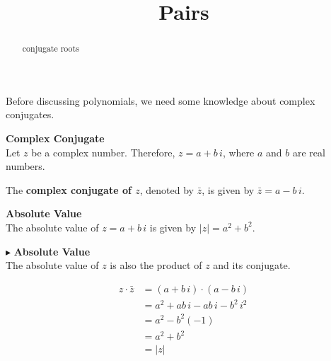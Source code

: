 \documentclass{ximera}
\title{Pairs}
\begin{document}
\begin{abstract}
conjugate roots
\end{abstract}
\maketitle







Before discussing polynomials, we need some knowledge about complex conjugates.




\begin{definition} \textbf{\textcolor{green!50!black}{Complex Conjugate}} \\

Let $z$ be a complex number.  Therefore, $z = a + b \, i$, where $a$ and $b$ are real numbers.



The \textbf{complex conjugate of $z$}, denoted by $\bar{z}$, is given by $\bar{z} = a - b \, i$.



\end{definition}








\begin{definition}   \textbf{\textcolor{green!50!black}{Absolute Value}} \\

The absolute value of $z = a + b \, i$ is given by $|z| = a^2 + b^2$. 


\end{definition}




$\blacktriangleright$ \textbf{Absolute Value}  \\

The absolute value of $z$ is also the product of $z$ and its conjugate.


\begin{align*}
z \cdot \bar{z} &= (a + b \, i) \cdot (a - b \, i) \\
                &= a^2 + ab \, i - ab \, i - b^2 \, i^2 \\
                &= a^2 - b^2 (-1) \\
                &= a^2 + b^2  \\
                &= |z|  
\end{align*}
\end{document}
